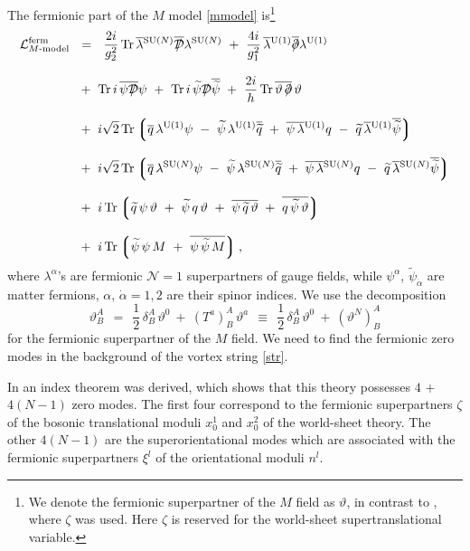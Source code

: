 \documentclass[12pt]{article}
\def\Tr{{\rm Tr}}
\newcommand{\none}{${\mathcal N}=1$ }
\newcommand{\p}{\partial}
\newcommand{\wt}{\widetilde}
\newcommand{\ov}{\overline}
\newcommand{\mc}[1]{\mathcal{#1}}
\newcommand{\md}{\mathcal{D}}
\newcommand{\lgr}{\left\lgroup}
\newcommand{\rgr}{\right\rgroup}
\def\slashed#1{\setbox0=\hbox{$#1$}             %
   \dimen0=\wd0                                 %
   \setbox1=\hbox{/} \dimen1=\wd1               %
   \ifdim\dimen0>\dimen1                        %
      \rlap{\hbox to \dimen0{\hfil/\hfil}}      %
      #1                                        %
   \else                                        %
      \rlap{\hbox to \dimen1{\hfil$#1$\hfil}}   %
      /                                         %
   \fi}                                        %
\begin{document}
	The fermionic part of the $M$ model \eqref{mmodel} is\footnote{
We denote the fermionic superpartner of the $M$ field as $\vartheta$, in contrast to \cite{GSYmmodel},
where $\zeta$ was used. Here $\zeta$ is reserved for the world-sheet supertranslational variable.}
\begin{align}
%
\notag
	\mc{L}_\text{$M$-model}^\text{ferm} & ~~=~~ 
		\frac{2i}{g_2^2}\, \Tr\, \ov{\lambda}{}^\text{SU($N$)} \ov{\slashed{\md}} \lambda^{\text{SU($N$)}}
		~+~ \frac{4i}{g_1^2}\, \ov{\lambda}{}^\text{U(1)} \ov{\slashed{\p}} \lambda^\text{U(1)}
	\\[3mm]
%
\notag
	&~
 		~+~ \Tr\, i\, \ov{\psi \slashed{\md}} \psi  
		~+~ \Tr\, i\, \wt{\psi} \slashed{\md} \ov{\wt{\psi}}
		~+~ \frac{2i}{h}\, \Tr\, \ov{\vartheta\,\slashed{\p}}\,\vartheta
	\\[3mm]
%
\label{fermact}
	&~
		~+~
		i \sqrt{2}\, \Tr 
		\lgr \ov{q}\,\lambda^\text{U(1)}\psi ~-~ \wt{\psi}\,\lambda^\text{U(1)}\ov{\wt{q}}
		 ~+~ \ov{\psi\, \lambda}{}^\text{U(1)} q ~-~ \wt{q}\,\ov{\lambda}{}^\text{U(1)}\ov{\wt{\psi}} \rgr
	\\[3mm]
%
\notag
	&~
		~+~
		i \sqrt{2}\, \Tr
		\lgr \ov{q}\,\lambda^\text{SU($N$)}\psi ~-~ \wt{\psi}\,\lambda^\text{SU($N$)}\ov{\wt{q}}
		 ~+~ \ov{\psi\, \lambda}{}^\text{SU($N$)}q ~-~ \wt{q}\,\ov{\lambda}{}^\text{SU($N$)}\ov{\wt{\psi}} \rgr
	\\[3mm]
%
\notag
	&~
		~+~
		i\,\Tr \lgr
			    \wt{q}\, \psi\,\vartheta ~+~ \wt{\psi}\,q\,\vartheta 
			~+~ \ov{\psi\, \wt{q}\,\vartheta}  ~+~ \ov{q\,\wt{\psi}\,\vartheta} \rgr
	\\[3mm]
%
\notag
	&~
		~+~
		i\,\Tr \lgr
				\wt{\psi}\,\psi\,M ~+~ \ov{\psi\, \wt{\psi}\, M} \rgr ,
\end{align}
where $\lambda^{\alpha}$'s are fermionic \none superpartners of gauge fields, while $\psi^{\alpha}$,
 $\tilde{\psi}_{\dot{\alpha}}$ are matter fermions, $\alpha$, $\dot{\alpha}=1,2$ are 
 their spinor indices.
	We use the decomposition
\[
	\vartheta^A_B ~~=~~ \frac{1}{2}\,\delta^A_B\, \vartheta^0  ~+~
				(T^a)^A_B\, \vartheta^{a}  ~~\equiv~~
			\frac{1}{2}\,\delta^A_B\, \vartheta^0  ~+~
				(\vartheta^N)^A_B
\]
	for the fermionic superpartner of the $M$ field.
	We need to find the fermionic zero modes in the background of the vortex string \eqref{str}.

	In \cite{GSYmmodel} an index theorem was derived, which shows that this theory possesses
	$ 4 $ $ + $ $ 4 ( N - 1 ) $ zero modes.
	The first four correspond to the fermionic superpartners $ \zeta $ of the bosonic translational moduli
	$ x_0^1 $ and $ x_0^2 $ of the world-sheet theory. 
	The other $ 4 ( N - 1 ) $ are the superorientational modes which are associated with the 
	fermionic superpartners $ \xi^l $ of the orientational moduli $ n^l $.
\end{document}
